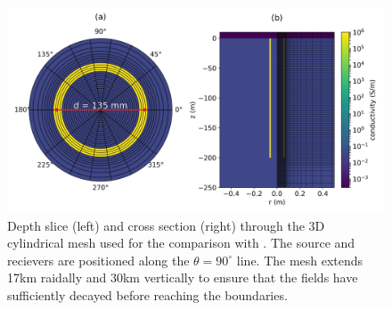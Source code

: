 \begin{figure}
    \begin{center}
    \includegraphics[width=0.8\columnwidth]{figures/casing_software/commer_model.png}
    \end{center}
\caption{
    Depth slice (left) and cross section (right) through the 3D cylindrical
    mesh used for the comparison with \cite{Commer2015}.
    The source and recievers are positioned along the $\theta = 90^\circ$ line.
    The mesh extends 17km raidally and 30km vertically to ensure that the fields
    have sufficiently decayed before reaching the boundaries.
}
\label{fig:commer_model}
\end{figure}
